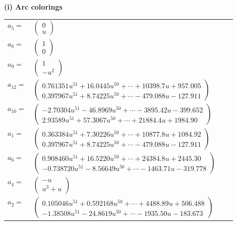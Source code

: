 \documentclass[1p]{elsarticle_modified}
\theoremstyle{definition}
\begin{document}
\flushleft \textbf{(i) Arc colorings}\\
\begin{tabular}{m{7pt} m{180pt} m{7pt} m{180pt} }
\flushright $a_{5}=$&$\begin{pmatrix}0\\u\end{pmatrix}$ \\
\flushright $a_{8}=$&$\begin{pmatrix}1\\0\end{pmatrix}$ \\
\flushright $a_{9}=$&$\begin{pmatrix}1\\- u^2\end{pmatrix}$ \\
\flushright $a_{12}=$&$\begin{pmatrix}0.761351 u^{51}+16.0445 u^{50}+\cdots+10398.7 u+957.005\\0.397967 u^{51}+8.74225 u^{50}+\cdots-479.088 u-127.911\end{pmatrix}$ \\
\flushright $a_{10}=$&$\begin{pmatrix}-2.70304 u^{51}-46.8969 u^{50}+\cdots-3895.42 u-399.652\\2.93589 u^{51}+57.3067 u^{50}+\cdots+21884.4 u+1984.90\end{pmatrix}$ \\
\flushright $a_{1}=$&$\begin{pmatrix}0.363384 u^{51}+7.30226 u^{50}+\cdots+10877.8 u+1084.92\\0.397967 u^{51}+8.74225 u^{50}+\cdots-479.088 u-127.911\end{pmatrix}$ \\
\flushright $a_{6}=$&$\begin{pmatrix}0.908460 u^{51}+16.5220 u^{50}+\cdots+24384.8 u+2445.30\\-0.738720 u^{51}-8.56649 u^{50}+\cdots-1463.71 u-319.778\end{pmatrix}$ \\
\flushright $a_{4}=$&$\begin{pmatrix}- u\\u^3+u\end{pmatrix}$ \\
\flushright $a_{2}=$&$\begin{pmatrix}0.105046 u^{51}+0.592168 u^{50}+\cdots+4488.89 u+506.488\\-1.38508 u^{51}-24.8619 u^{50}+\cdots-1935.50 u-183.673\end{pmatrix}$ \\

\end{tabular}
\end{document}
